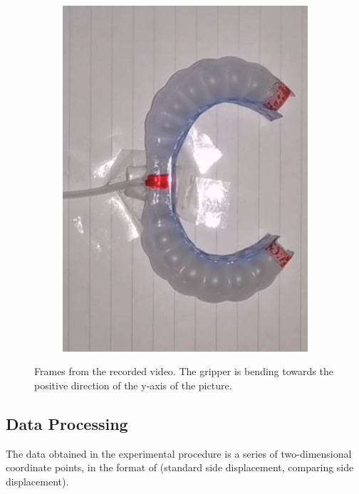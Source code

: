 \documentclass[conference]{IEEEtran}
\begin{document}
\begin{figure}[htbp]
\begin{subfigure}[b]{0.25\linewidth}
    \includegraphics[width=\linewidth]{pics/变形3.png}
    \caption{}
    \label{fig:image3}
  \end{subfigure}
  \caption{Frames from the recorded video. The gripper is bending towards the positive direction of the y-axis of the picture.}
  \label{fig:three_images}
\end{figure}

\subsection{Data Processing}
\label{Processing}

The data obtained in the experimental procedure is a series of two-dimensional coordinate points, in the format of (standard side displacement, comparing side displacement).
\end{document}
